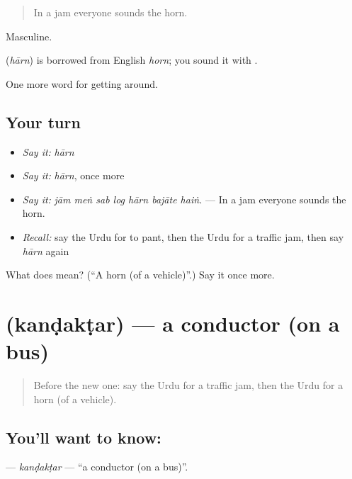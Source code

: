 \begin{quote}
In a jam everyone sounds the horn.
\end{quote}

Masculine.

\begin{cousinweb}
\textbf{} (\emph{hārn}) is borrowed from English \emph{horn}; you sound it with \textbf{}.
\end{cousinweb}

\begin{grammarlens}[title={What you've built}]
One more word for getting around.
\end{grammarlens}

\subsection*{Your turn}
\begin{itemize}
\raggedright
  \item \emph{Say it:} \emph{hārn}
  \item \emph{Say it:} \emph{hārn}, once more
  \item \emph{Say it:} \emph{jām meṅ sab log hārn bajāte haiṅ.} — In a jam everyone sounds the horn.
  \item \emph{Recall:} say the Urdu for to pant, then the Urdu for a traffic jam, then say \emph{hārn} again
\end{itemize}

\begin{tcolorbox}[breakable,colback=teal!4,colframe=teal!35!black,title={Before you move on}]
What does  mean? (\textquotedblleft{}A horn (of a vehicle)\textquotedblright{}.) Say it once more.
\end{tcolorbox}
\section[\texorpdfstring{\ur{کنڈکٹر} (kanḍakṭar)}{کنڈکٹر (kanḍakṭar)}]{ (kanḍakṭar) — a conductor (on a bus)}

\label{lesson:UR-C393-kandaktar}



\begin{quote}
Before the new one: say the Urdu for a traffic jam, then the Urdu for a horn (of a vehicle).
\end{quote}

\subsection*{You'll want to know: }
\textbf{} — \emph{kanḍakṭar} — \textquotedblleft{}a conductor (on a bus)\textquotedblright{}.

